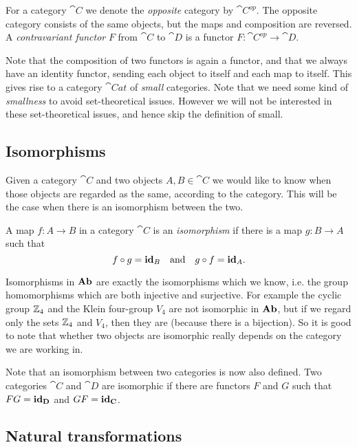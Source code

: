 For a category $\cat{C}$ we denote the \emph{opposite} category by $\cat{C}^{op}$. The opposite category consists of the same objects, but the maps and composition are reversed. A \emph{contravariant functor} $F$ from $\cat{C}$ to $\cat{D}$ is a functor $F: \cat{C}^{op} \to \cat{D}$.

Note that the composition of two functors is again a functor, and that we always have an identity functor, sending each object to itself and each map to itself. This gives rise to a category $\cat{Cat}$ of \emph{small} categories. Note that we need some kind of \emph{smallness} to avoid set-theoretical issues. However we will not be interested in these set-theoretical issues, and hence skip the definition of small.

\subsection{Isomorphisms}
Given a category $\cat{C}$ and two objects $A, B \in \cat{C}$ we would like to know when those objects are regarded as the same, according to the category. This will be the case when there is an isomorphism between the two.

\begin{definition}
	A map $f: A \to B$ in a category $\cat{C}$ is an \emph{isomorphism} if there is a map $g: B \to A$ such that
	$$ f \circ g = \mathbf{id}_B \quad\text{and}\quad g \circ f = \mathbf{id}_A.$$
\end{definition}

Isomorphisms in $\mathbf{Ab}$ are exactly the isomorphisms which we know, i.e. the group homomorphisms which are both injective and surjective.
For example the cyclic group $\mathbb{Z}_4$ and the Klein four-group $V_4$ are not isomorphic in $\mathbf{Ab}$, but if we regard only the sets $\mathbb{Z}_4$ and $V_4$, then they are (because there is a bijection). So it is good to note that whether two objects are isomorphic  really depends on the category we are working in.

Note that an isomorphism between two categories is now also defined. Two categories $\cat{C}$ and $\cat{D}$ are isomorphic if there are functors $F$ and $G$ such that $ FG = \mathbf{id}_{\mathbf{D}}$ and $GF = \mathbf{id}_{\mathbf{C}}$.

\subsection{Natural transformations}

